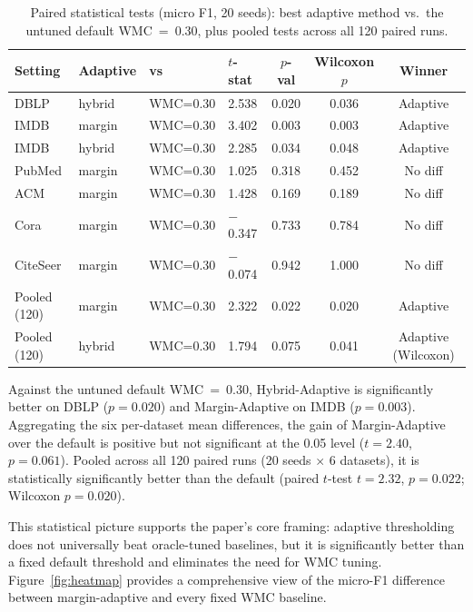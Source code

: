 \documentclass[pdflatex,sn-mathphys-num]{sn-jnl}%
\theoremstyle{thmstyleone}%
\theoremstyle{thmstyletwo}%
\theoremstyle{thmstylethree}%
\begin{document}
\begin{table}[ht]
\centering
\caption{Paired statistical tests (micro F1, 20 seeds): best adaptive method vs.\ the untuned default WMC~=~0.30, plus pooled tests across all 120 paired runs.}
\label{tab:stats}
\begin{tabular}{llllccc}
\toprule
\textbf{Setting} & \textbf{Adaptive} & \textbf{vs} & \textbf{$t$-stat} & \textbf{$p$-val} & \textbf{Wilcoxon $p$} & \textbf{Winner} \\
\midrule
DBLP      & hybrid & WMC=0.30 & 2.538 & 0.020 & 0.036 & Adaptive \\
IMDB      & margin & WMC=0.30 & 3.402 & 0.003 & 0.003 & Adaptive \\
IMDB      & hybrid & WMC=0.30 & 2.285 & 0.034 & 0.048 & Adaptive \\
PubMed    & margin & WMC=0.30 & 1.025 & 0.318 & 0.452 & No diff \\
ACM       & margin & WMC=0.30 & 1.428 & 0.169 & 0.189 & No diff \\
Cora      & margin & WMC=0.30 & $-$0.347 & 0.733 & 0.784 & No diff \\
CiteSeer  & margin & WMC=0.30 & $-$0.074 & 0.942 & 1.000 & No diff \\
Pooled (120) & margin & WMC=0.30 & 2.322 & 0.022 & 0.020 & Adaptive \\
Pooled (120) & hybrid & WMC=0.30 & 1.794 & 0.075 & 0.041 & Adaptive (Wilcoxon) \\
\bottomrule
\end{tabular}
\end{table}

Against the untuned default WMC~=~0.30, Hybrid-Adaptive is significantly better on DBLP ($p = 0.020$) and Margin-Adaptive on IMDB ($p = 0.003$).
Aggregating the six per-dataset mean differences, the gain of Margin-Adaptive over the default is positive but not significant at the 0.05 level ($t = 2.40$, $p = 0.061$).
Pooled across all 120 paired runs (20 seeds $\times$ 6 datasets), it is statistically significantly better than the default (paired $t$-test $t = 2.32$, $p = 0.022$; Wilcoxon $p = 0.020$).

This statistical picture supports the paper's core framing: adaptive thresholding does not universally beat oracle-tuned baselines, but it is significantly better than a fixed default threshold and eliminates the need for WMC tuning.
Figure~\ref{fig:heatmap} provides a comprehensive view of the micro-F1 difference between margin-adaptive and every fixed WMC baseline.
\end{document}
